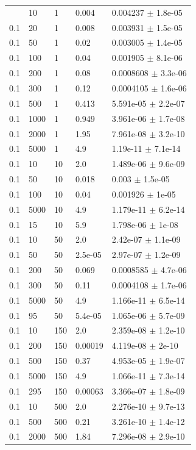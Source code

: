 \begin{longtable}{lllll}
	\bottomrule
	\endlastfoot
	0.1 & 10 & 1 & 0.004 & 0.004237 $\pm$ 1.8e-05 \\
	0.1 & 20 & 1 & 0.008 & 0.003931 $\pm$ 1.5e-05 \\
	0.1 & 50 & 1 & 0.02  & 0.003005 $\pm$ 1.4e-05 \\
	0.1 & 100 & 1 & 0.04 & 0.001905 $\pm$ 8.1e-06 \\
	0.1 & 200 & 1 & 0.08 & 0.0008608 $\pm$ 3.3e-06 \\
	0.1 & 300 & 1 & 0.12 & 0.0004105 $\pm$ 1.6e-06 \\
	0.1 & 500 & 1 & 0.413 & 5.591e-05 $\pm$ 2.2e-07 \\
	0.1 & 1000 & 1 & 0.949& 3.961e-06 $\pm$ 1.7e-08 \\
	0.1 & 2000 & 1 & 1.95 & 7.961e-08 $\pm$ 3.2e-10 \\
	0.1 & 5000 & 1 & 4.9 & 1.19e-11 $\pm$ 7.1e-14 \\
	0.1 & 10 & 10 & 2.0 & 1.489e-06 $\pm$ 9.6e-09 \\
	0.1 & 50 & 10 & 0.018 & 0.003 $\pm$ 1.5e-05 \\
	0.1 & 100 & 10 & 0.04 & 0.001926 $\pm$ 1e-05 \\
	0.1 & 5000 & 10 & 4.9 & 1.179e-11 $\pm$ 6.2e-14 \\
	0.1 & 15 & 10 & 5.9 & 1.798e-06 $\pm$ 1e-08 \\
	0.1 & 10 & 50 & 2.0 & 2.42e-07 $\pm$ 1.1e-09 \\
	0.1 & 50 & 50 & 2.5e-05 & 2.97e-07 $\pm$ 1.2e-09 \\
	0.1 & 200 & 50 & 0.069 & 0.0008585 $\pm$ 4.7e-06 \\
	0.1 & 300 & 50 & 0.11 & 0.0004108 $\pm$ 1.7e-06 \\
	0.1 & 5000 & 50 & 4.9 & 1.166e-11 $\pm$ 6.5e-14 \\
	0.1 & 95 & 50 & 5.4e-05 & 1.065e-06 $\pm$ 5.7e-09 \\
	0.1 & 10 & 150 & 2.0 & 2.359e-08 $\pm$ 1.2e-10 \\
	0.1 & 200 & 150 & 0.00019 & 4.119e-08 $\pm$ 2e-10 \\
	0.1 & 500 & 150 & 0.37 & 4.953e-05 $\pm$ 1.9e-07 \\
	0.1 & 5000 & 150 & 4.9 & 1.066e-11 $\pm$ 7.3e-14 \\
	0.1 & 295 & 150 & 0.00063 & 3.366e-07 $\pm$ 1.8e-09 \\
	0.1 & 10 & 500 & 2.0 & 2.276e-10 $\pm$ 9.7e-13 \\
	0.1 & 500 & 500 & 0.21 & 3.261e-10 $\pm$ 1.4e-12 \\
	0.1 & 2000 & 500 & 1.84 & 7.296e-08 $\pm$ 2.9e-10 \\

\end{longtable}

